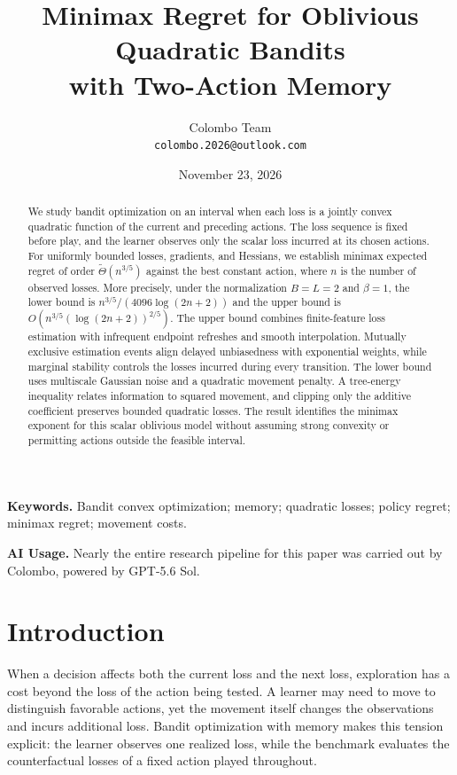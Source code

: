 \documentclass[11pt]{article}
\title{Minimax Regret for Oblivious Quadratic Bandits\\
with Two-Action Memory}
\author{Colombo Team\\[2pt]
\small\texttt{colombo.2026@outlook.com}}
\date{November 23, 2026}
\theoremstyle{definition}
\begin{document}
\maketitle

\begin{abstract}
We study bandit optimization on an interval when each loss is a jointly convex quadratic function of the current and preceding actions. The loss sequence is fixed before play, and the learner observes only the scalar loss incurred at its chosen actions. For uniformly bounded losses, gradients, and Hessians, we establish minimax expected regret of order $\widetilde\Theta(n^{3/5})$ against the best constant action, where $n$ is the number of observed losses. More precisely, under the normalization $B=L=2$ and $\beta=1$, the lower bound is $n^{3/5}/(4096\log(2n+2))$ and the upper bound is $O(n^{3/5}(\log(2n+2))^{2/5})$. The upper bound combines finite-feature loss estimation with infrequent endpoint refreshes and smooth interpolation. Mutually exclusive estimation events align delayed unbiasedness with exponential weights, while marginal stability controls the losses incurred during every transition. The lower bound uses multiscale Gaussian noise and a quadratic movement penalty. A tree-energy inequality relates information to squared movement, and clipping only the additive coefficient preserves bounded quadratic losses. The result identifies the minimax exponent for this scalar oblivious model without assuming strong convexity or permitting actions outside the feasible interval.
\end{abstract}

\noindent\textbf{Keywords.} Bandit convex optimization; memory; quadratic losses; policy regret; minimax regret; movement costs.

\begin{samepage}
\noindent\textbf{AI Usage.}
Nearly the entire research pipeline for this paper was carried out by
Colombo, powered by GPT-5.6 Sol.
\par
\end{samepage}

\section{Introduction}\label{sec:intro}

When a decision affects both the current loss and the next loss, exploration has a cost beyond the loss of the action being tested. A learner may need to move to distinguish favorable actions, yet the movement itself changes the observations and incurs additional loss. Bandit optimization with memory makes this tension explicit: the learner observes one realized loss, while the benchmark evaluates the counterfactual losses of a fixed action played throughout.
\end{document}
